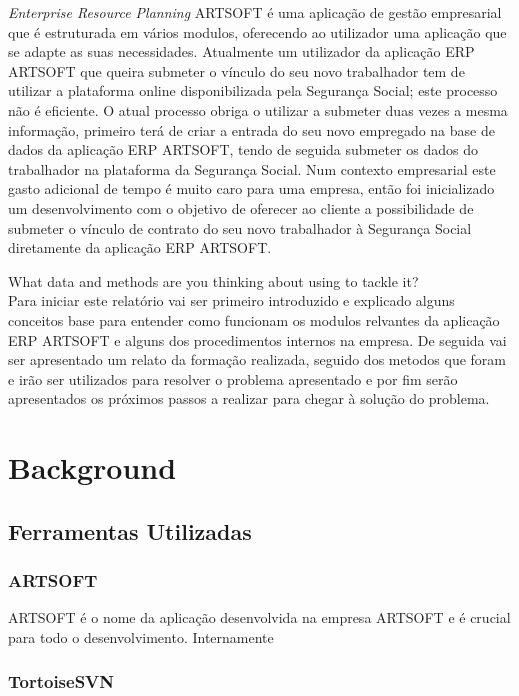 \documentclass[sigplan]{acmart}
\begin{document}
\textit{Enterprise Resource Planning} ARTSOFT é uma aplicação de gestão empresarial que é estruturada em vários modulos, oferecendo ao utilizador uma aplicação que se adapte as suas necessidades. Atualmente um utilizador da aplicação ERP ARTSOFT que queira submeter o vínculo do seu novo trabalhador tem de utilizar a plataforma online disponibilizada pela Segurança Social; este processo não é eficiente. O atual processo obriga o utilizar a submeter duas vezes a mesma informação, primeiro terá de criar a entrada do seu novo empregado na base de dados da aplicação ERP ARTSOFT, tendo de seguida submeter os dados do trabalhador na plataforma da Segurança Social. Num contexto empresarial este gasto adicional de tempo é muito caro para uma empresa, então foi inicializado um desenvolvimento com o objetivo de oferecer ao cliente a possibilidade de submeter o vínculo de contrato do seu novo trabalhador à Segurança Social diretamente da aplicação ERP ARTSOFT.

What data and methods are you thinking about using to tackle it? \\ %

Para iniciar este relatório vai ser primeiro introduzido e explicado alguns conceitos base para entender como funcionam os modulos relvantes da aplicação ERP ARTSOFT e alguns dos procedimentos internos na empresa. De seguida vai ser apresentado um relato da formação realizada, seguido dos metodos que foram e irão ser utilizados para resolver o problema apresentado e por fim serão apresentados os próximos passos a realizar para chegar à solução do problema.

\section{Background} \label{sec:background}

\subsection{Ferramentas Utilizadas}

\subsubsection{ARTSOFT}

ARTSOFT é o nome da aplicação desenvolvida na empresa ARTSOFT e é crucial para todo o desenvolvimento. Internamente  

\subsubsection{TortoiseSVN}
\end{document}
